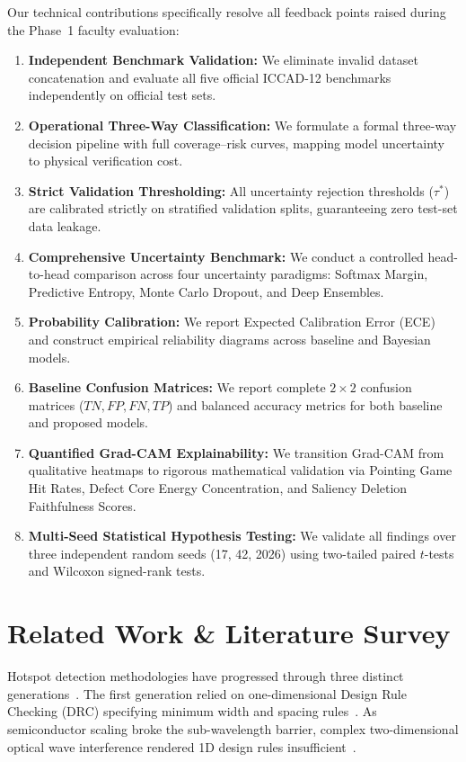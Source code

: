 \documentclass[conference]{IEEEtran}
\begin{document}
Our technical contributions specifically resolve all feedback points raised during the Phase~1 faculty evaluation:
\begin{enumerate}
    \item \textbf{Independent Benchmark Validation:} We eliminate invalid dataset concatenation and evaluate all five official ICCAD-12 benchmarks independently on official test sets.
    \item \textbf{Operational Three-Way Classification:} We formulate a formal three-way decision pipeline with full coverage--risk curves, mapping model uncertainty to physical verification cost.
    \item \textbf{Strict Validation Thresholding:} All uncertainty rejection thresholds ($\tau^*$) are calibrated strictly on stratified validation splits, guaranteeing zero test-set data leakage.
    \item \textbf{Comprehensive Uncertainty Benchmark:} We conduct a controlled head-to-head comparison across four uncertainty paradigms: Softmax Margin, Predictive Entropy, Monte Carlo Dropout, and Deep Ensembles.
    \item \textbf{Probability Calibration:} We report Expected Calibration Error (ECE) and construct empirical reliability diagrams across baseline and Bayesian models.
    \item \textbf{Baseline Confusion Matrices:} We report complete $2 \times 2$ confusion matrices ($TN, FP, FN, TP$) and balanced accuracy metrics for both baseline and proposed models.
    \item \textbf{Quantified Grad-CAM Explainability:} We transition Grad-CAM from qualitative heatmaps to rigorous mathematical validation via Pointing Game Hit Rates, Defect Core Energy Concentration, and Saliency Deletion Faithfulness Scores.
    \item \textbf{Multi-Seed Statistical Hypothesis Testing:} We validate all findings over three independent random seeds (17, 42, 2026) using two-tailed paired $t$-tests and Wilcoxon signed-rank tests.
\end{enumerate}

\section{Related Work \& Literature Survey}
Hotspot detection methodologies have progressed through three distinct generations~\cite{yang2019lithography}. The first generation relied on one-dimensional Design Rule Checking (DRC) specifying minimum width and spacing rules~\cite{torres2002integrated}. As semiconductor scaling broke the sub-wavelength barrier, complex two-dimensional optical wave interference rendered 1D design rules insufficient~\cite{gupta2003manufacturing}.
\end{document}
